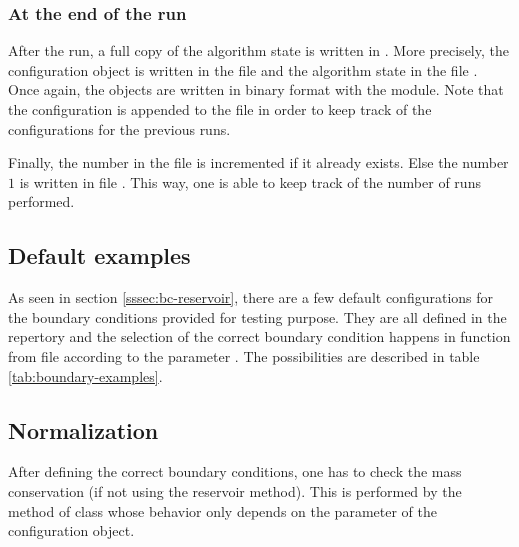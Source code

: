         \subsubsection{At the end of the run}
        \noindent

            After the run, a full copy of the algorithm state is written in . More precisely,
            the configuration object is written in the file  and the algorithm state in
            the file . Once again, the objects are written in binary format with the
            \cpck{} module. Note that the configuration is appended to the file in order to keep track
            of the configurations for the previous runs.

            Finally, the number in the file  is incremented if it already exists. Else
            the number $1$ is written in file . This way, one is able to keep track of
            the number of runs performed.

    \subsection{Default examples\label{sssec:examples}}
    \noindent

        As seen in section \ref{sssec:bc-reservoir}, there are a few default configurations for the boundary conditions
        provided for testing purpose. They are all defined in the repertory  and the
        selection of the correct boundary condition happens in function  from file
         according to the parameter . The possibilities are described in
        table \ref{tab:boundary-examples}.

        

    \subsection{Normalization\label{sssec:normalization}}
    \noindent

        After defining the correct boundary conditions, one has to check the mass conservation (if not using the reservoir method).
        This is performed by the  method of class  whose behavior only depends on
        the  parameter of the configuration object.

